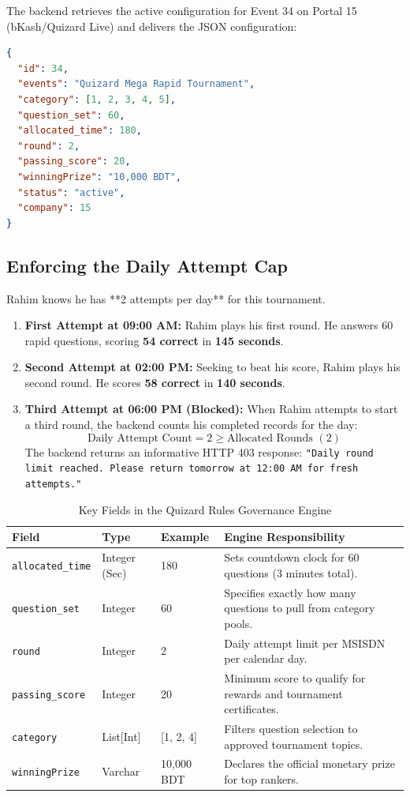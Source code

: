 The backend retrieves the active configuration for Event 34 on Portal 15 (bKash/Quizard Live) and delivers the JSON configuration:

\begin{lstlisting}[language=json, caption={Rules Engine JSON Payload for 60-Question Tournament}]
{
  "id": 34,
  "events": "Quizard Mega Rapid Tournament",
  "category": [1, 2, 3, 4, 5],
  "question_set": 60,
  "allocated_time": 180,
  "round": 2,
  "passing_score": 20,
  "winningPrize": "10,000 BDT",
  "status": "active",
  "company": 15
}
\end{lstlisting}

\subsection{Enforcing the Daily Attempt Cap}
Rahim knows he has **2 attempts per day** for this tournament. 

\begin{enumerate}
    \item \textbf{First Attempt at 09:00 AM:} Rahim plays his first round. He answers 60 rapid questions, scoring \textbf{54 correct} in \textbf{145 seconds}.
    \item \textbf{Second Attempt at 02:00 PM:} Seeking to beat his score, Rahim plays his second round. He scores \textbf{58 correct} in \textbf{140 seconds}.
    \item \textbf{Third Attempt at 06:00 PM (Blocked):} When Rahim attempts to start a third round, the backend counts his completed records for the day:
    $$\text{Daily Attempt Count} = 2 \ge \text{Allocated Rounds } (2)$$
    The backend returns an informative HTTP 403 response: \texttt{"Daily round limit reached. Please return tomorrow at 12:00 AM for fresh attempts."}
\end{enumerate}

\begin{table}[htbp]
\centering
\small
\begin{tabular}{|l|l|l|p{6.5cm}|}
\hline
\rowcolor{primaryBlue!15}
\textbf{Field} & \textbf{Type} & \textbf{Example} & \textbf{Engine Responsibility} \\ \hline
\texttt{allocated\_time} & Integer (Sec) & 180 & Sets countdown clock for 60 questions (3 minutes total). \\ \hline
\texttt{question\_set} & Integer & 60 & Specifies exactly how many questions to pull from category pools. \\ \hline
\texttt{round} & Integer & 2 & Daily attempt limit per MSISDN per calendar day. \\ \hline
\texttt{passing\_score} & Integer & 20 & Minimum score to qualify for rewards and tournament certificates. \\ \hline
\texttt{category} & List[Int] & [1, 2, 4] & Filters question selection to approved tournament topics. \\ \hline
\texttt{winningPrize} & Varchar & 10,000 BDT & Declares the official monetary prize for top rankers. \\ \hline
\end{tabular}
\caption{Key Fields in the Quizard Rules Governance Engine}
\end{table}

